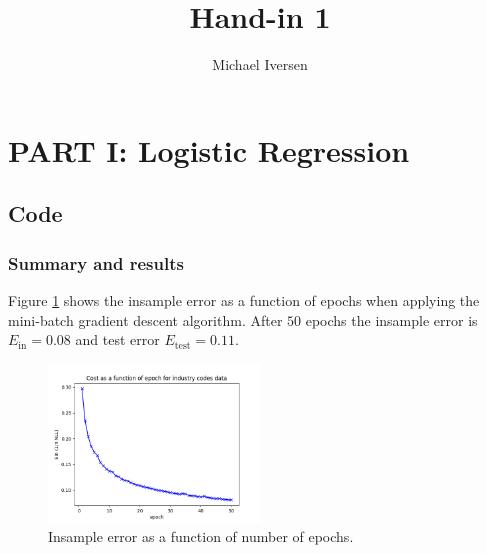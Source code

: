 \documentclass{article}
\title{Hand-in 1}
\author{Michael Iversen}
\begin{document}
\maketitle
\section*{PART I: Logistic Regression}
	\subsection*{Code}
	\subsubsection*{Summary and results}
	Figure \ref{fig:logreg} shows the insample error as a function of epochs when applying the mini-batch gradient descent algorithm.
	After $50$ epochs the insample error is $E_\mathrm{in} = 0.08$ and test error $E_\mathrm{test} = 0.11$.
	\begin{figure}
		\centering
		\includegraphics[width=0.5\textwidth]{logreg_text_cost_per_epoch.png}
		\caption{Insample error as a function of number of epochs.}
		\label{fig:logreg}
	\end{figure}
\end{document}
